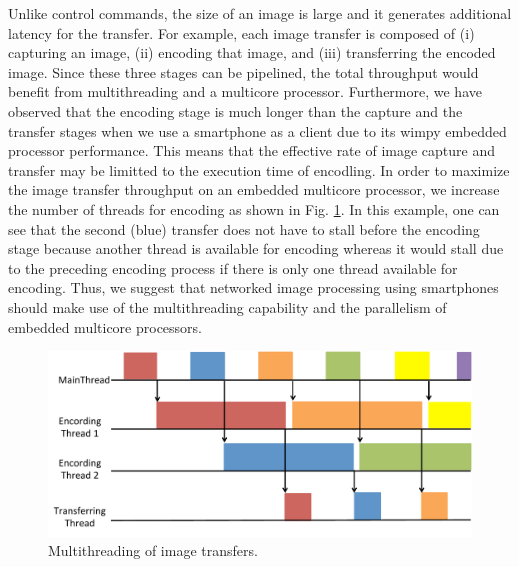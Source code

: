 Unlike control commands, the size of an image is large and it generates
additional latency for the transfer.
For example, each image transfer is composed of (i) capturing an image,
(ii) encoding that image, and (iii) transferring the encoded image.
Since these three stages can be pipelined, the total throughput would
benefit from multithreading and a multicore processor.
Furthermore, we have observed that the encoding stage is much longer
than the capture and the transfer stages when we use a smartphone as a
client due to its wimpy embedded processor performance.
This means that the effective rate of image capture and transfer may be
limitted to the execution time of encodling.
In order to maximize the image transfer throughput on an embedded
multicore processor, we increase the number of threads for encoding as
shown in Fig. \ref{fig:multithread}.
In this example, one can see that the second (blue) transfer does not
have to stall before the encoding stage because another thread is
available for encoding whereas it would stall due to the preceding
encoding process if there is only one thread available for encoding.
Thus, we suggest that networked image processing using smartphones
should make use of the multithreading capability and the parallelism of
embedded multicore processors.

\begin{figure}[!t]
 \centering
 \includegraphics[width=0.9\hsize]{fig/multithread.pdf}
 \caption{Multithreading of image transfers.}
 \label{fig:multithread}
\end{figure}

